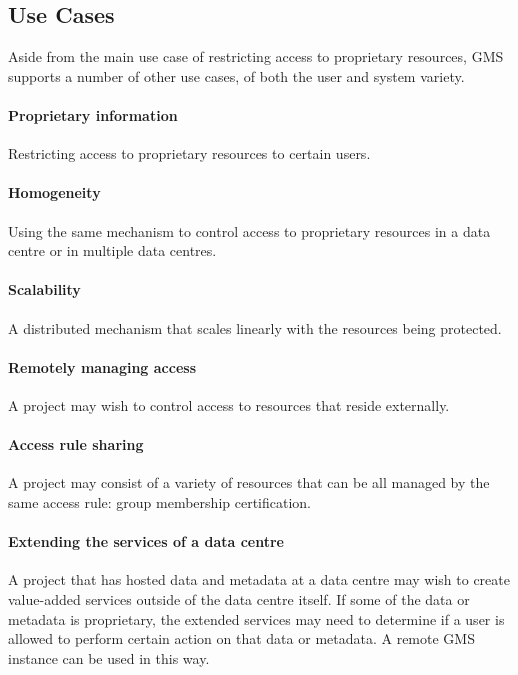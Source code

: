 \documentclass[11pt,a4paper]{ivoa}
\begin{document}
\subsection{Use Cases}

Aside from the main use case of restricting access to proprietary resources, GMS supports a number of other use cases, of both the user and system variety.

\paragraph{Proprietary information} Restricting access to proprietary resources to certain users.

\paragraph{Homogeneity} Using the same mechanism to control access to proprietary resources in a data centre or in multiple data centres.

\paragraph{Scalability} A distributed mechanism that scales linearly with the resources being protected.

\paragraph{Remotely managing access} A project may wish to control access to resources that reside externally.

\paragraph{Access rule sharing} A project may consist of a variety of resources that can be all managed by the same access rule: group membership certification.

\paragraph{Extending the services of a data centre} A project that has hosted data and metadata at a data centre may wish to create value-added services outside of the data centre itself.  If some of the data or metadata is proprietary, the extended services may need to determine if a user is allowed to perform certain action on that data or metadata.  A remote GMS instance can be used in this way.
\end{document}

